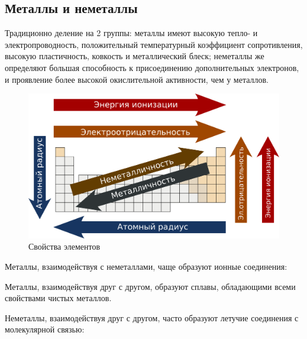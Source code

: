  \subsection{Металлы и неметаллы}
 
Традиционно деление на 2 группы: металлы имеют высокую тепло- и электропроводность, положительный температурный коэффициент сопротивления, высокую пластичность, ковкость и металлический блеск; неметаллы же определяют большая способность к присоединению дополнительных электронов, и проявление более высокой окислительной активности, чем у металлов.

\begin{figure}[H]
    \centering
    \includegraphics[width = \textwidth]{TeX/Pictures/2_properties.png}
    \caption{Свойства элементов}
    \label{fig:properties}
\end{figure}

Металлы, взаимодействуя с неметаллами, чаще образуют ионные соединения:


Металлы, взаимодействуя друг с другом, образуют сплавы, обладающими всеми свойствами чистых металлов.

Неметаллы, взаимодействуя друг с другом, часто образуют летучие соединения с молекулярной связью:


